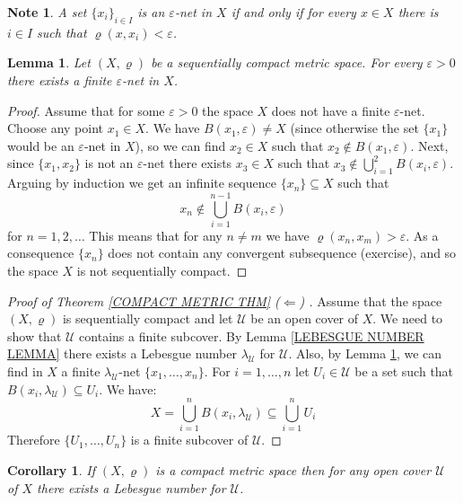 \documentclass[11pt, letterpaper, oneside]{report}
\theoremstyle{pplain}
\newtheorem{lemma}[theorem]{Lemma}
\newtheorem{corollary}[theorem]{Corollary}
\newtheorem{ITERMVALUE THM}[theorem]{Intermediate Value Theorem}
\newtheorem{HEINEBOREL THM}[theorem]{Heine-Borel Theorem}
\newtheorem{UMETR THM}[theorem]{Urysohn Metrization Theorem}
\newtheorem{UMETR2 THM}[theorem]{Urysohn Metrization Theorem (v.2)}
\theoremstyle{ddefinition}
\newtheorem{note}[theorem]{Note}
\theoremstyle{nnn}
\newtheorem{TDA NN}[theorem]{Topological Data Analysis. }
\theoremstyle{eexercise}
\newcommand{\La}{\Leftarrow}
\newcommand{\UU}{{\mathcal U}}
\begin{document}
\begin{note}
A set $\{x_{i}\}_{i\in I}$ is an $\varepsilon$-net in $X$ if and only if for every $x\in X$ there is $i\in I$
such that $\varrho(x, x_{i}) < \varepsilon$.
\end{note}

\begin{lemma}
\label{FINITE EPS NET LEMMA}
Let $(X, \varrho)$ be a sequentially compact metric space. For every $\varepsilon >0$ there 
exists a finite $\varepsilon$-net  in $X$.
\end{lemma}

\begin{proof}
Assume that for some $\varepsilon >0$ the space $X$ does not have a finite $\varepsilon$-net.
Choose any point $x_{1}\in X$. We have $B(x_{1}, \varepsilon)\neq X$ (since otherwise 
the set $\{x_{1}\}$ would be an $\varepsilon$-net in $X$), so we can find $x_{2}\in X$ such that 
$x_{2}\not\in B(x_{1}, \varepsilon)$. Next, since $\{x_{1}, x_{2}\}$ is not an $\varepsilon$-net
there exists $x_{3}\in X$ such that $x_{3}\not\in \bigcup_{i=1}^{2} B(x_{i}, \varepsilon)$. Arguing 
by induction we get an infinite sequence $\{x_{n}\}\subseteq X$ such that 
$$x_{n}\not\in \bigcup_{i=1}^{n-1}B(x_{i}, \varepsilon)$$
for  $n=1, 2, \dots$ This means that for any $n\neq m$ we have $\varrho(x_{n}, x_{m}) > \varepsilon$. 
As a consequence $\{x_{n}\}$ does not contain any convergent subsequence (exercise), and so 
the space $X$ is not sequentially compact. 
\end{proof}


\begin{proof}[Proof of Theorem \ref{COMPACT METRIC THM} ($\La$) ]
Assume that the space $(X, \varrho)$ is sequentially compact and let 
$\UU$ be an open cover of $X$. We need to show that $\UU$ contains a finite subcover. 
By Lemma \ref{LEBESGUE NUMBER LEMMA} there exists a Lebesgue number 
$\lambda_{\UU}$ for $\UU$. Also, by Lemma \ref{FINITE EPS NET LEMMA}, we can find 
in $X$ a finite $\lambda_{\UU}$-net $\{ x_{1}, \dots, x_{n}\}$. For $i=1, \dots, n$ let  
$U_{i}\in \UU$ be a set such that $B(x_{i}, \lambda_{\UU})\subseteq U_{i}$. We have:
$$X = \bigcup_{i=1}^{n}B(x_{i}, \lambda_{\UU}) \subseteq \bigcup_{i=1}^{n} U_{i}$$
Therefore $\{U_{1}, \dots, U_{n}\}$ is a finite subcover of $\UU$.
\end{proof}

\begin{corollary}
\label{LEBESGUE NUMBER COR}
If $(X, \varrho)$ is a compact metric space then for any  open cover $\UU$ of $X$
there exists a Lebesgue number for $\UU$. 
\end{corollary}
\end{document}
